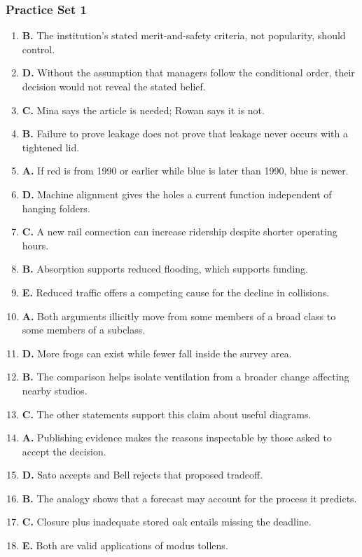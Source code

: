 \subsubsection*{Practice Set 1}
\begin{enumerate}
\item \textbf{B.} The institution's stated merit-and-safety criteria, not popularity, should control.
\item \textbf{D.} Without the assumption that managers follow the conditional order, their decision would not reveal the stated belief.
\item \textbf{C.} Mina says the article is needed; Rowan says it is not.
\item \textbf{B.} Failure to prove leakage does not prove that leakage never occurs with a tightened lid.
\item \textbf{A.} If red is from 1990 or earlier while blue is later than 1990, blue is newer.
\item \textbf{D.} Machine alignment gives the holes a current function independent of hanging folders.
\item \textbf{C.} A new rail connection can increase ridership despite shorter operating hours.
\item \textbf{B.} Absorption supports reduced flooding, which supports funding.
\item \textbf{E.} Reduced traffic offers a competing cause for the decline in collisions.
\item \textbf{A.} Both arguments illicitly move from some members of a broad class to some members of a subclass.
\item \textbf{D.} More frogs can exist while fewer fall inside the survey area.
\item \textbf{B.} The comparison helps isolate ventilation from a broader change affecting nearby studios.
\item \textbf{C.} The other statements support this claim about useful diagrams.
\item \textbf{A.} Publishing evidence makes the reasons inspectable by those asked to accept the decision.
\item \textbf{D.} Sato accepts and Bell rejects that proposed tradeoff.
\item \textbf{B.} The analogy shows that a forecast may account for the process it predicts.
\item \textbf{C.} Closure plus inadequate stored oak entails missing the deadline.
\item \textbf{E.} Both are valid applications of modus tollens.

\end{enumerate}
